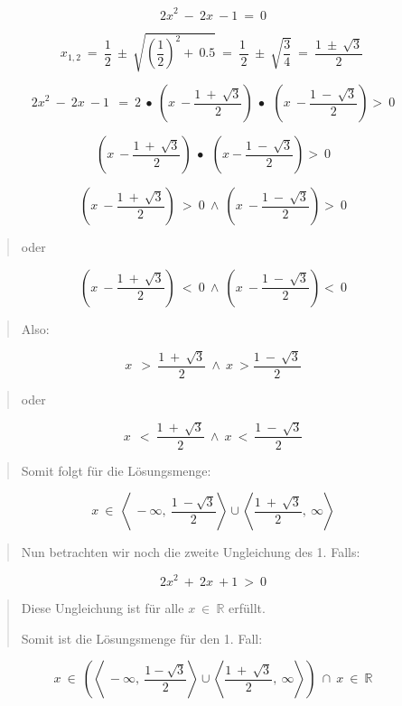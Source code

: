 \documentclass[a4paper, 12pt]{book}
\begin{document}
\begin{longtable}[]
\begin{minipage}[b]{\linewidth}
\[{2x}^{2}\  - \ 2x\  - 1\  = \ 0\]

\[x_{1,2}\  = \ \frac{1}{2}\  \pm \ \sqrt{\left( \frac{1}{2} \right)^{2} + \ 0.5}\  = \ \frac{1\ }{2}\  \pm \ \sqrt{\frac{3}{4}}\  = \ \frac{1\  \pm \ \sqrt{3}}{2}\ \]

\[{2x}^{2}\  - \ 2x\  - 1\ \  = \ 2\  \bullet \ (x\  - \frac{1\  + \ \sqrt{3}}{2})\  \bullet \ \ (x\  - \frac{1\  - \ \sqrt{3}}{2}) > \ 0\]

\[(x\  - \frac{1\  + \ \sqrt{3}}{2})\  \bullet \ \ (x - \frac{1\  - \ \sqrt{3}}{2}) > \ 0\]

\[(x\  - \frac{1\  + \ \sqrt{3}}{2})\  > \ 0\  \land \ (x\  - \frac{1\  - \ \sqrt{3}}{2}) > \ 0\]

\begin{quote}
oder
\end{quote}

\[(x\  - \frac{1\  + \ \sqrt{3}}{2})\  < \ 0\  \land \ (x\  - \frac{1\  - \ \sqrt{3}}{2}) < \ 0\]

\begin{quote}
Also:
\end{quote}

\[x\ \  > \ \frac{1\  + \ \sqrt{3}}{2}\  \land \ x\  > \frac{1\  - \ \sqrt{3}}{2}\]

\begin{quote}
oder
\end{quote}

\[x\ \  < \ \frac{1\  + \ \sqrt{3}}{2}\  \land \ x\  < \ \frac{1\  - \ \sqrt{3}}{2}\]

\begin{quote}
Somit folgt für die Lösungsmenge:
\end{quote}

\[x\  \in \ \left\langle \  - \infty,\ \frac{1\  - \sqrt{3}}{2} \right\rangle \cup \left\langle \frac{1\  + \ \sqrt{3}}{2},\ \infty \right\rangle\]

\begin{quote}
Nun betrachten wir noch die zweite Ungleichung des 1. Falls:
\end{quote}

\[{2x}^{2}\  + \ 2x\  + 1\  > \ 0\]

\begin{quote}
Diese Ungleichung ist für alle \(x\mathbb{\  \in \ R}\) erfüllt.

Somit ist die Lösungsmenge für den 1. Fall:
\end{quote}

\[x\  \in \ (\left\langle \  - \infty,\ \frac{1 - \sqrt{3}}{2} \right\rangle \cup \left\langle \frac{1\  + \ \sqrt{3}}{2},\ \infty \right\rangle)\  \cap \ x\mathbb{\  \in \ R}\]


\end{minipage}
\end{longtable}
\end{document}
